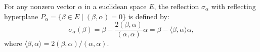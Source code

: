 For any nonzero vector $\alpha$ in a euclidean space $E$, the reflection $\sigma_\alpha$ with reflecting hyperplane $P_\alpha = \{\beta \in E \mid (\beta, \alpha) = 0\}$ is defined by:
$$\sigma_\alpha(\beta) = \beta - \frac{2(\beta, \alpha)}{(\alpha, \alpha)}\alpha = \beta - \langle\beta, \alpha\rangle \alpha,$$
where $\langle\beta, \alpha\rangle = 2(\beta, \alpha)/(\alpha, \alpha)$.

